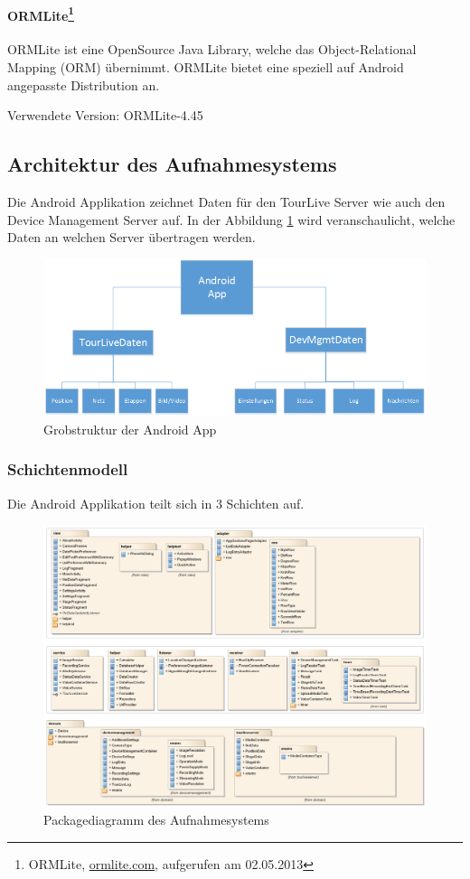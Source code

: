 \paragraph{ORMLite\footnote{ORMLite, \url{ormlite.com}, aufgerufen am 02.05.2013}} ORMLite ist eine OpenSource Java Library, welche das Object-Relational Mapping (ORM) übernimmt. ORMLite bietet eine speziell auf Android angepasste Distribution an. 

Verwendete Version: ORMLite-4.45

\newpage

\subsection{Architektur des Aufnahmesystems}
Die Android Applikation zeichnet Daten für den TourLive Server wie auch den Device Management Server auf. In der Abbildung \ref{fig:grobstrukturandroid}
 wird veranschaulicht, welche Daten an welchen Server übertragen werden.

\begin{figure}[H]
	\centering
	\includegraphics[width=120mm]{images/android/uebersicht.png}
	\caption{Grobstruktur der Android App}
	\label{fig:grobstrukturandroid} 
\end{figure}

\subsubsection{Schichtenmodell}
Die Android Applikation teilt sich in 3 Schichten auf.

\begin{figure}[H]
	\centering
	\includegraphics[width=150mm]{images/android/schichten.jpg}
	\caption{Packagediagramm des Aufnahmesystems}
\end{figure}

